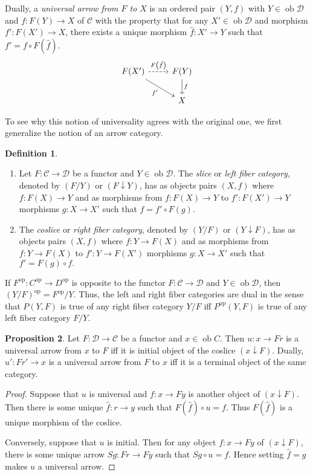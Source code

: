 \documentclass[10pt,letterpaper,cm]{nupset}
\theoremstyle{definition}
\newtheorem{definition}{Definition}[section]
\theoremstyle{theorem}
\newtheorem{prop}[definition]{Proposition}
\theoremstyle{remark}
\newcommand{\1}{\mathbf{1}}
\renewcommand{\c}{\mathscr{C}}
\renewcommand{\d}{\mathscr{D}}
\newcommand{\0}{\vec 0}
\DeclareMathOperator{\op}{op}
\DeclareMathOperator{\ob}{ob}
\begin{document}
Dually, a \textit{universal arrow from $F$ to $X$} is an ordered pair $(Y, f)$ with $Y \in \ob \d$ and $f: F(Y) \to X$ of $\c$ with the property that for any $X' \in \ob \d$ and morphism $f' : F(X') \to X$, there exists a unique morphism $\hat{f}: X' \to Y$ such that $f' = f \circ F\left(\hat{f}\right)$.
\[ \begin{tikzcd}
F(X') \arrow[r, dashed, "F\left(\hat{f}\right)"] \arrow[swap, dr,  " f' "] & F(Y) \arrow[d, "f"] \\%
 & X
\end{tikzcd}
\]



To see why this notion of universality agrees with the original one, we first generalize the notion of an arrow category.

\begin{definition} $ $
\begin{enumerate}
\item Let $F: \c \to \d$ be a functor and $Y \in \ob \d$. The \textit{slice} or \textit{left fiber category}, denoted by $\left(F/Y\right)$ or $\left(F \downarrow Y\right)$, has as objects pairs $(X, f)$ where $f: F(X) \to Y$ and as morphisms from $f : F(X) \to Y$ to $f' : F(X') \to Y$ morphisms $g : X \to X'$ such that $f = f' \circ F(g).$ 
\item 
The \textit{coslice} or \textit{right fiber category}, denoted by $\left(Y/F\right)$ or $\left(Y \downarrow F\right)$, has as objects pairs $(X, f)$ where $f: Y\to F(X)$ and as morphisms from $f :  Y \to F(X)$ to $f' : Y \to F(X')$ morphisms $g : X \to X'$ such that $f' = F(g) \circ f.$
\end{enumerate}
\end{definition}



If $F^{\op}:C^{\op} \to D^{\op}$ is opposite to the functor $F: \c \to \d$ and $Y \in \ob \d$, then $(Y/F)^{\op} = {F^{\op}}/{Y}$. Thus, the left and right fiber categories are dual in the sense that $P(Y, F)$ is true of any right fiber category ${Y}/{F}$ iff $P^{\op}(Y, F)$ is true of any left fiber category ${F}/{Y}$. 

\smallskip

\begin{prop}
Let $F : \d \to \c$ be a functor and $x \in \ob C$. Then $u : x \to Fr$ is a universal arrow from $x$ to $F$ iff it is initial object of the coslice $\left(x \downarrow F\right)$. Dually, $u' : Fr' \to x$ is a universal arrow from $F$ to $x$  iff it is a terminal object of the same category.
\end{prop}
\begin{proof}
Suppose that $u$ is universal and $f: x \to Fy$ is another object of $(x \downarrow F)$. Then there is some unique $\hat{f}: r \to y$ such that $F\left(\hat{f}\right) \circ u = f$. Thus $F\left(\hat{f}\right)$ is a unique morphism of the coslice.

\smallskip

Conversely, suppose that $u$ is initial. Then for any object $f: x \to Fy$ of $(x \downarrow F)$, there is some unique arrow $Sg : Fr \to Fy$ such that $Sg \circ u = f$. Hence setting $\hat{f} = g$ makes $u$ a universal arrow.
\end{proof}
\end{document}

